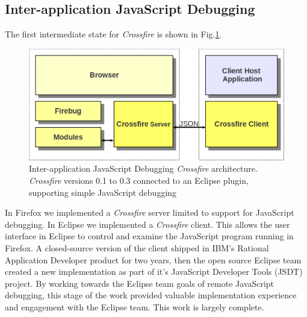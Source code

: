 \subsection{Inter-application JavaScript Debugging}
The first intermediate state for \textit{Crossfire} is shown in Fig.\ref{fig:fireclipse}.
\begin{figure}[htp]
  \includegraphics  [width = 86 mm] {figures/fireclipse.png}
  \caption{Inter-application JavaScript Debugging \textit{Crossfire} architecture.
\textit{Crossfire} versions 0.1 to 0.3 connected to an Eclipse plugin, supporting simple JavaScript debugging}
 \label{fig:fireclipse}
\end{figure}
In Firefox we implemented a \textit{Crossfire} server limited to support for JavaScript debugging.
In Eclipse we implemented a \textit{Crossfire} client. This allows the user interface in Eclipse to control
 and examine the JavaScript program running
in Firefox.  A closed-source version of the client shipped in IBM's Rational Application Developer product for two years,
then the open source Eclipse team created a new implementation as part of it's JavaScript Developer
Tools (JSDT) project\cite{JSDT}.  By working towards the Eclipse team goals of
remote JavaScript debugging, this stage of the work provided valuable implementation 
experience and engagement with the Eclipse team.
This work is largely complete.


